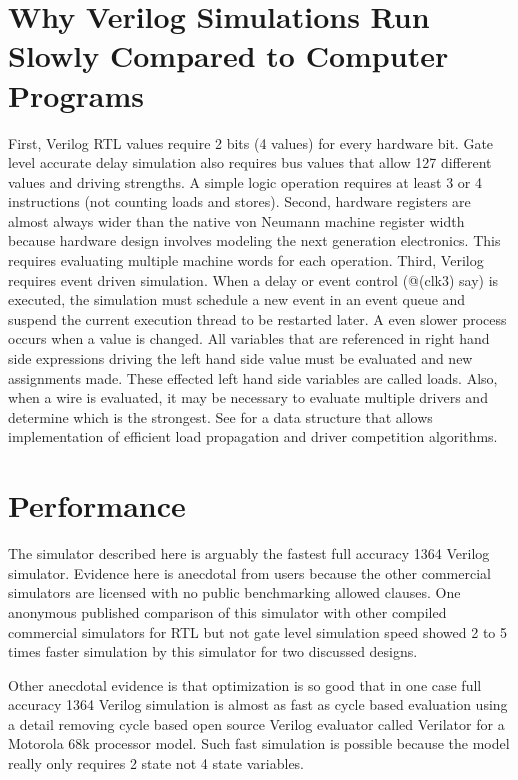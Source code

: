 \documentclass[preprint, authoryear]{sigplanconf}
\begin{document}
\section{Why Verilog Simulations Run Slowly Compared to Computer Programs}
\par
First, Verilog RTL values require 2 bits (4 values) for every hardware bit.
Gate level accurate delay simulation also requires bus values that
allow 127 different values and driving strengths.  A simple logic
operation requires at least 3 or 4 instructions (not counting loads and
stores).  Second, hardware registers are almost always wider than
the native von Neumann machine register width because hardware design involves
modeling the next generation electronics.  This requires evaluating
multiple machine words for each operation.  Third, Verilog requires  
event driven simulation.  When a delay or event control (@(clk3) say)
is executed, the simulation must schedule a new event in an event
queue and suspend the current execution thread to be restarted later.
A even slower process occurs when a value is changed.  All variables
that are referenced in right hand side expressions driving the
left hand side value must be evaluated and new assignments made.
These effected left hand side variables are called
loads.  Also, when a wire is evaluated, it may be necessary to evaluate
multiple drivers and determine which is the strongest.  See \cite{Meyer1988}
for a data structure that allows implementation of efficient load propagation
and driver competition algorithms.
\section{Performance}
\par
The simulator described here is arguably the fastest full accuracy 1364
Verilog simulator.
Evidence here is anecdotal from users because the other commercial
simulators are licensed with no public benchmarking allowed clauses.
One anonymous published comparison of this simulator with other
compiled commercial simulators for RTL but not gate
level simulation speed \cite{Semiwiki2011} showed 2 to 5 times
faster simulation by this simulator for two discussed designs.
\par
Other anecdotal evidence is that
optimization is so good that
in one case full accuracy 1364 Verilog simulation is almost as fast as
cycle based evaluation using a detail removing cycle based
open source Verilog evaluator called Verilator for a Motorola 68k
processor model.
Such fast simulation is possible because the model really only
requires 2 state not 4 state variables.
\end{document}
